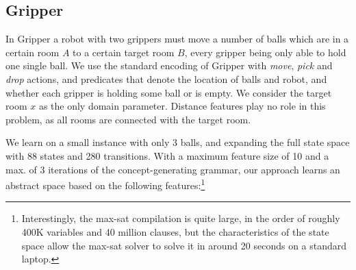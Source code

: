 \documentclass[12pt]{article}
\newcommand{\Omit}[1]{}
\newcommand{\set}[1]{\ensuremath{\left\{#1 \right\}}}
\newcommand{\abs}[1]{\ensuremath{\left\vert{#1}\right\vert}}
\begin{document}
\Omit{
\subsection{Creating a Tower in Blocksworld}

With a 5-block state space, and using concepts up to size 15, the abstraction we find overfits
to the fact that there are only that many blocks. To illustrate, the existence of a tower
of size $3$ can be expressed with the feature
$\abs{\exists on . (\exists on . ontable)} > 0$,
that of a tower of size $4$, with the concept
$\abs{\exists on .\left[ \exists on . (\exists on . ontable)\right]} > 0$, and so on.

Interestingly, expressing the notion of ``a single tower'' using our concept-based language turns out to be harder
that expression the notion of ``a single tower with block $x$ at the bottom''. Whereas no truly generalized expression
for the first is found through our approach with a maximum feature size of 15, the feature 
$$\abs{\neg \set{x} \sqcap (\forall on^* . \neg \set{x})},$$
\noindent denotes how many blocks $y \neq x$ are not above $x$ (when this is 0, we must necessarily
have a tower based on $x$), and has only size $8$.
}

\subsection{Gripper}

In Gripper a robot with two grippers must move a number of balls which are in a certain room $A$ to a certain target room $B$,
every gripper being only able to hold one single ball. We use the standard encoding of Gripper with 
\emph{move}, \emph{pick} and \emph{drop} actions, and predicates that denote the location of balls and robot,
and whether each gripper is holding some ball or is empty. We consider the target room $x$ as the only domain parameter.
Distance features play no role in this problem, as all rooms are connected with the target room.

We learn on a small instance with only 3 balls, and expanding the full state space with 88 states and 280 transitions.
With a maximum feature size of 10 and a max. of
3 iterations of the concept-generating grammar, our approach learns an abstract space based on the following features:\footnote{
Interestingly, the max-sat compilation is quite large, in the order of roughly 400K variables and 40 million clauses, but the characteristics
of the state space allow the max-sat solver to solve it in around 20 seconds on a standard laptop.} 
\end{document}
